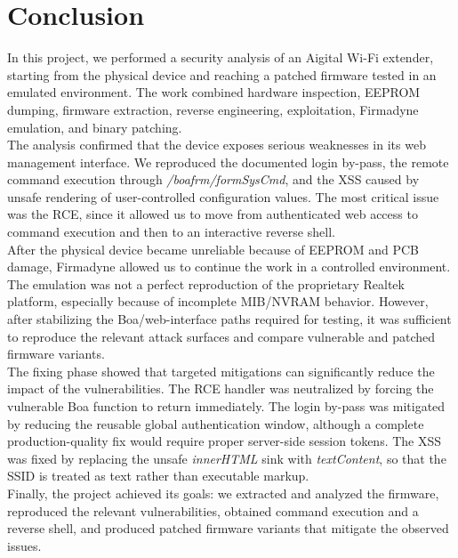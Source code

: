 \chapter{Conclusion}
\label{chap:conclusion}

In this project, we performed a security analysis of an Aigital Wi-Fi extender, starting from the physical device and reaching a patched firmware tested in an emulated environment. The work combined hardware inspection, EEPROM dumping, firmware extraction, reverse engineering, exploitation, Firmadyne emulation, and binary patching.
\\
The analysis confirmed that the device exposes serious weaknesses in its web management interface. We reproduced the documented login by-pass, the remote command execution through \emph{/boafrm/formSysCmd}, and the XSS caused by unsafe rendering of user-controlled configuration values. The most critical issue was the RCE, since it allowed us to move from authenticated web access to command execution and then to an interactive reverse shell.
\\
After the physical device became unreliable because of EEPROM and PCB damage, Firmadyne allowed us to continue the work in a controlled environment. The emulation was not a perfect reproduction of the proprietary  Realtek platform, especially because of incomplete MIB/NVRAM behavior. However, after stabilizing the Boa/web-interface paths required for testing, it was sufficient to reproduce the relevant attack surfaces and compare vulnerable and patched firmware variants.
\\
The fixing phase showed that targeted mitigations can significantly reduce the impact of the vulnerabilities. The RCE handler was neutralized by forcing the vulnerable Boa function to return immediately. The login by-pass was mitigated by reducing the reusable global authentication window, although a complete production-quality fix would require proper server-side session tokens. The XSS was fixed by replacing the unsafe \emph{innerHTML} sink with \emph{textContent}, so that the SSID is treated as text rather than executable markup.
\\
Finally, the project achieved its goals: we extracted and analyzed the firmware, reproduced the relevant vulnerabilities, obtained command execution and a reverse shell, and produced patched firmware variants that mitigate the observed issues.